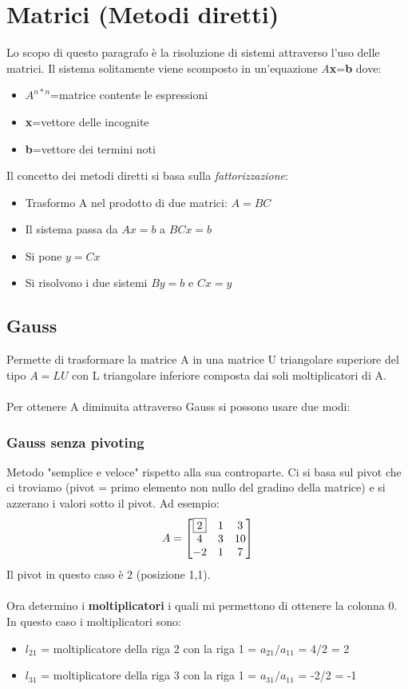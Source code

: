 \section{Matrici (Metodi diretti)}
\label{Matrici (Metodi diretti)}

Lo scopo di questo paragrafo è la risoluzione di sistemi attraverso l'uso delle matrici. Il sistema solitamente viene scomposto in un'equazione \textit{A}\textbf{x}=\textbf{b} dove:
\begin{itemize}
\item $A^{n*n}$=matrice contente le espressioni
\item \textbf{x}=vettore delle incognite
\item \textbf{b}=vettore dei termini noti
\end{itemize}

\noindent
Il concetto dei metodi diretti si basa sulla \textit{fattorizzazione}:
\begin{itemize}
\item Trasformo A nel prodotto di due matrici: $A = BC$
\item Il sistema passa da $Ax = b$ a $BC x = b$
\item Si pone $y = Cx$
\item Si risolvono i due sistemi $B y = b$ e $C x = y$ 
\end{itemize}



\subsection{Gauss}
\label{Gauss}
Permette di trasformare la matrice A in una matrice U triangolare superiore del tipo \textit{$A = LU$} con L triangolare inferiore composta dai soli moltiplicatori di A.
\\
\\
Per ottenere A diminuita attraverso Gauss si possono usare due modi:
\subsubsection{Gauss senza pivoting}
\label{Gauss senza pivoting}
Metodo "semplice e veloce" rispetto alla sua controparte. Ci si basa sul pivot che ci troviamo (pivot = primo elemento non nullo del gradino della matrice) e si azzerano i valori sotto il pivot. Ad esempio:
$$ A =
\begin{bmatrix}
\fbox{2} & 1 & 3 \\
4 & 3 & 10 \\
-2 & 1 & 7 
\end{bmatrix}
$$
\noindent
Il pivot in questo caso è 2 (posizione 1,1).
\\
\\
Ora determino i \textbf{moltiplicatori} i quali mi permettono di ottenere la colonna 0. In questo caso i moltiplicatori sono:
\begin{itemize}
\item $l_{21}$ = moltiplicatore della riga 2 con la riga 1 = $a_{21}/a_{11}$ = 4/2 = 2
\item $l_{31}$ = moltiplicatore della riga 3 con la riga 1 = $a_{31}/a_{11}$ = -2/2 = -1
\end{itemize}


